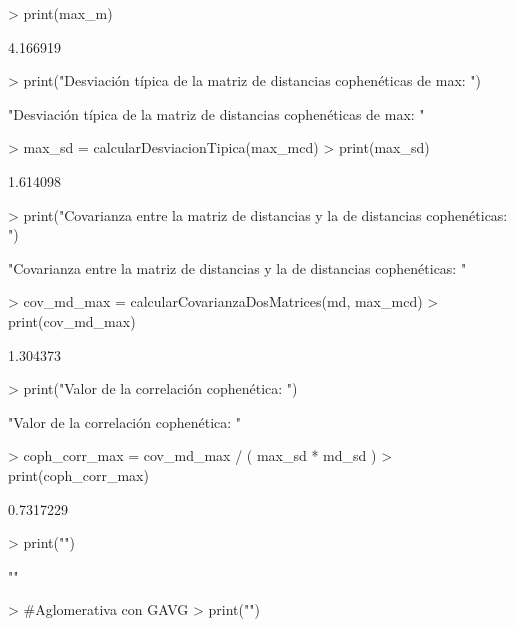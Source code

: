 \documentclass[parskip=full]{scrartcl}
\begin{document}
\begin{Schunk}
\begin{Sinput}
> print(max_m)
\end{Sinput}
\begin{Soutput}
[1] 4.166919
\end{Soutput}
\begin{Sinput}
> print("Desviación típica de la matriz de distancias cophenéticas de max: ")
\end{Sinput}
\begin{Soutput}
[1] "Desviación típica de la matriz de distancias cophenéticas de max: "
\end{Soutput}
\begin{Sinput}
> max_sd = calcularDesviacionTipica(max_mcd)
> print(max_sd)
\end{Sinput}
\begin{Soutput}
[1] 1.614098
\end{Soutput}
\begin{Sinput}
> print("Covarianza entre la matriz de distancias y la de distancias cophenéticas: ")
\end{Sinput}
\begin{Soutput}
[1] "Covarianza entre la matriz de distancias y la de distancias cophenéticas: "
\end{Soutput}
\begin{Sinput}
> cov_md_max = calcularCovarianzaDosMatrices(md, max_mcd)
> print(cov_md_max)
\end{Sinput}
\begin{Soutput}
[1] 1.304373
\end{Soutput}
\begin{Sinput}
> print("Valor de la correlación cophenética: ")
\end{Sinput}
\begin{Soutput}
[1] "Valor de la correlación cophenética: "
\end{Soutput}
\begin{Sinput}
> coph_corr_max = cov_md_max / ( max_sd * md_sd )
> print(coph_corr_max)
\end{Sinput}
\begin{Soutput}
[1] 0.7317229
\end{Soutput}
\begin{Sinput}
> print("")
\end{Sinput}
\begin{Soutput}
[1] ""
\end{Soutput}
\begin{Sinput}
> #Aglomerativa con GAVG
> print("")
\end{Sinput}
\begin{Soutput}

\end{Soutput}
\end{Schunk}
\end{document}

